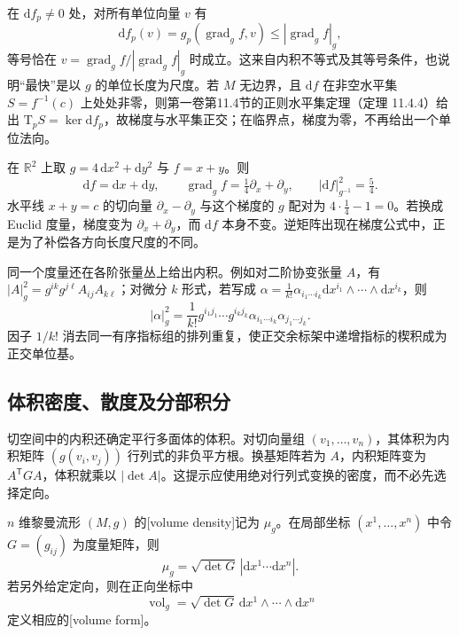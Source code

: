 
在 \(\mathrm{d}f_p\ne0\) 处，对所有单位向量 \(v\) 有
\[
	\mathrm{d}f_p(v)=g_p(\operatorname{grad}_g f,v)
	\leq|\operatorname{grad}_g f|_g,
\]
等号恰在 \(v=\operatorname{grad}_g f/|\operatorname{grad}_g f|_g\) 时成立。这来自内积不等式及其等号条件，也说明“最快”是以 \(g\) 的单位长度为尺度。若 \(M\) 无边界，且 \(\mathrm{d}f\) 在非空水平集 \(S=f^{-1}(c)\) 上处处非零，则第一卷第11.4节的正则水平集定理（定理 11.4.4）给出 \(\mathrm{T}_pS=\ker\mathrm{d}f_p\)，故梯度与水平集正交；在临界点，梯度为零，不再给出一个单位法向。

\begin{example}
	\label{g3:exm:gradient-metric-dependence}
	在 \(\mathbb R^2\) 上取 \(g=4\,\mathrm{d}x^2+\mathrm{d}y^2\) 与 \(f=x+y\)。则
	\[
		\mathrm{d}f=\mathrm{d}x+\mathrm{d}y,\qquad
		\operatorname{grad}_g f=\tfrac14\partial_x+\partial_y,
		\qquad |\mathrm{d}f|_{g^{-1}}^2=\tfrac54.
	\]
	水平线 \(x+y=c\) 的切向量 \(\partial_x-\partial_y\) 与这个梯度的 \(g\) 配对为 \(4\cdot\tfrac14-1=0\)。若换成 Euclid 度量，梯度变为 \(\partial_x+\partial_y\)，而 \(\mathrm{d}f\) 本身不变。逆矩阵出现在梯度公式中，正是为了补偿各方向长度尺度的不同。
\end{example}

同一个度量还在各阶张量丛上给出内积。例如对二阶协变张量 \(A\)，有 \(|A|_g^2=g^{ik}g^{j\ell}A_{ij}A_{k\ell}\)；对微分 \(k\) 形式，若写成 \(\alpha=\frac1{k!}\alpha_{i_1\cdots i_k}\mathrm{d}x^{i_1}\wedge\cdots\wedge\mathrm{d}x^{i_k}\)，则
\[
	|\alpha|_g^2=\frac1{k!}
	g^{i_1j_1}\cdots g^{i_kj_k}
	\alpha_{i_1\cdots i_k}\alpha_{j_1\cdots j_k}.
\]
因子 \(1/k!\) 消去同一有序指标组的排列重复，使正交余标架中递增指标的楔积成为正交单位基。

\subsection{体积密度、散度及分部积分}
\label{g3:subsec:0101:03}

切空间中的内积还确定平行多面体的体积。对切向量组 \((v_1,\ldots,v_n)\)，其体积为内积矩阵 \((g(v_i,v_j))\) 行列式的非负平方根。换基矩阵若为 \(A\)，内积矩阵变为 \(A^{\mathsf T}GA\)，体积就乘以 \(|\det A|\)。这提示应使用绝对行列式变换的密度，而不必先选择定向。

\begin{definition}
	\label{g3:def:metric-volume-density}
	\(n\) 维黎曼流形 \((M,g)\) 的[volume density]记为 \(\mu_g\)。在局部坐标 \((x^1,\ldots,x^n)\) 中令 \(G=(g_{ij})\) 为度量矩阵，则
	\begin{equation}
		\label{g3:eq:volume-density}
		\mu_g=\sqrt{\det G}\,|\mathrm{d}x^1\cdots\mathrm{d}x^n|.
	\end{equation}
	若另外给定定向，则在正向坐标中
	\[
		\operatorname{vol}_g=\sqrt{\det G}\,\mathrm{d}x^1\wedge\cdots\wedge\mathrm{d}x^n
	\]
	定义相应的[volume form]。
\end{definition}


